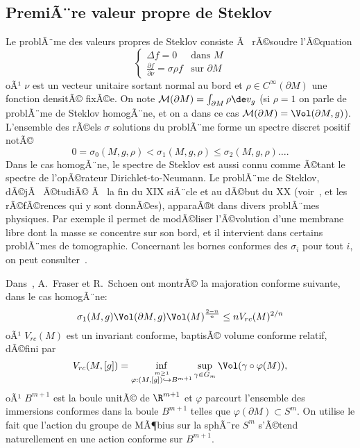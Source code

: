 \documentclass[11pt,a4paper]{smfart}
\begin{document}
\subsection{PremiÃ¨re valeur propre de Steklov}\label{conforme:stek}
Le problÃ¨me des valeurs propres de Steklov consiste Ã  rÃ©soudre l'Ã©quation
\begin{equation}
\left\{\begin{array}{ll}
\Delta f=0 & \textrm{dans }M\\
\frac{\partial f}{\partial \nu}=\sigma \rho f & \textrm{sur }\partial M
\end{array}\right.
\end{equation}
oÃ¹ $\nu$ est un vecteur unitaire sortant normal au bord et 
$\rho\in C^\infty(\partial M)$ une fonction densitÃ© fixÃ©e. On note
$\mathcal M(\partial M)=\int_{\partial M}\rho\de v_g$ (si $\rho=1$ on parle
de problÃ¨me de Steklov homogÃ¨ne, et on a dans ce cas $\mathcal M(\partial M)
=\Vol(\partial M,g)$). L'ensemble des
rÃ©els $\sigma$ solutions du problÃ¨me forme un spectre discret positif
notÃ©
\begin{equation}
0=\sigma_0(M,g,\rho)<\sigma_1(M,g,\rho)\leq\sigma_2(M,g,\rho)\ldots.
\end{equation}
Dans le cas homogÃ¨ne, le spectre de Steklov est aussi connu comme Ã©tant 
le spectre de l'opÃ©rateur Dirichlet-to-Neumann. Le problÃ¨me de Steklov,
dÃ©jÃ  Ã©tudiÃ© Ã  la fin du XIX\ieme{} siÃ¨cle et au dÃ©but du XX\ieme{} 
(voir~\cite{st99}, \cite{st02} et les rÃ©fÃ©rences qui y sont donnÃ©es), 
apparaÃ®t dans divers problÃ¨mes physiques. Par exemple il
permet de modÃ©liser l'Ã©volution d'une membrane libre dont la masse se
concentre sur son bord, et il intervient dans certains problÃ¨mes de 
tomographie. Concernant les bornes conformes des $\sigma_i$ pour tout $i$,
on peut consulter~\cite{ha11}.

Dans~\cite{fs11}, A.~Fraser et R.~Schoen ont montrÃ© la majoration conforme
suivante, dans le cas homogÃ¨ne:
\begin{equation}\label{conf:stek}
\sigma_1(M,g)\Vol(\partial M,g)\Vol(M)^{\frac{2-n}n}\leq nV_{rc}(M)^{2/n}
\end{equation}
oÃ¹ $V_{rc}(M)$ est un invariant conforme, baptisÃ© volume conforme relatif, 
dÃ©fini par
\begin{equation}\label{conf:vrc}
V_{rc}(M,[g])=\inf_{\stackrel{m\geq 1}{\varphi:(M,[g])\hookrightarrow B^{m+1}}}
\sup_{\gamma\in G_m}\Vol(\gamma\circ\varphi(M)),
\end{equation}
oÃ¹ $B^{m+1}$ est la boule unitÃ© de $\R^{m+1}$ et $\varphi$ parcourt l'ensemble 
des immersions conformes dans la boule $B^{m+1}$ telles que 
$\varphi(\partial M)\subset S^m$. On utilise le fait
que l'action du groupe de MÃ¶bius sur la sphÃ¨re $S^m$ s'Ã©tend naturellement
en une action conforme sur $B^{m+1}$. 
\end{document}

